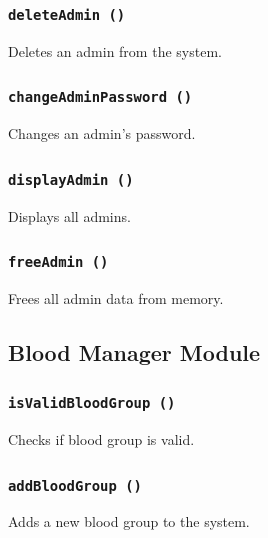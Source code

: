 \documentclass[12pt,a4paper]{report}
\begin{document}
\subsubsection{\texttt{deleteAdmin ()}}
Deletes an admin from the system.


\subsubsection{\texttt{changeAdminPassword ()}}
Changes an admin's password.


\subsubsection{\texttt{displayAdmin ()}}
Displays all admins.


\subsubsection{\texttt{freeAdmin ()}}
Frees all admin data from memory.


\subsection{Blood Manager Module}
\subsubsection{\texttt{isValidBloodGroup ()}}
Checks if blood group is valid.


\subsubsection{\texttt{addBloodGroup ()}}
Adds a new blood group to the system.

\end{document}
